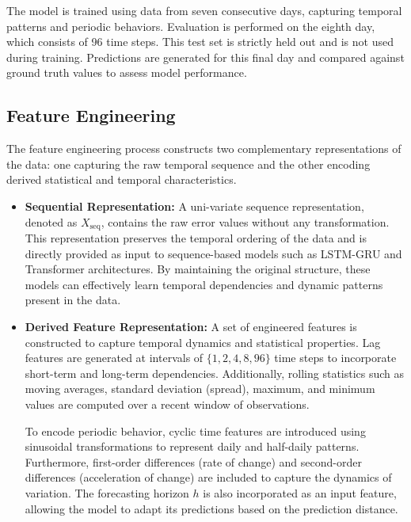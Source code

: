 \documentclass[conference]{IEEEtran}
\begin{document}
The model is trained using data from seven consecutive days, capturing temporal patterns and periodic behaviors. Evaluation is performed on the eighth day, which consists of 96 time steps. This test set is strictly held out and is not used during training. Predictions are generated for this final day and compared against ground truth values to assess model performance.

\subsection{Feature Engineering}

The feature engineering process constructs two complementary representations of the data: one capturing the raw temporal sequence and the other encoding derived statistical and temporal characteristics.

\begin{itemize}

\item \textbf{Sequential Representation:}  
A uni-variate sequence representation, denoted as $X_{\text{seq}}$, contains the raw error values without any transformation. This representation preserves the temporal ordering of the data and is directly provided as input to sequence-based models such as LSTM-GRU and Transformer architectures. By maintaining the original structure, these models can effectively learn temporal dependencies and dynamic patterns present in the data.

\item \textbf{Derived Feature Representation:}  
A set of engineered features is constructed to capture temporal dynamics and statistical properties. Lag features are generated at intervals of $\{1, 2, 4, 8, 96\}$ time steps to incorporate short-term and long-term dependencies. Additionally, rolling statistics such as moving averages, standard deviation (spread), maximum, and minimum values are computed over a recent window of observations.

To encode periodic behavior, cyclic time features are introduced using sinusoidal transformations to represent daily and half-daily patterns. Furthermore, first-order differences (rate of change) and second-order differences (acceleration of change) are included to capture the dynamics of variation. The forecasting horizon $h$ is also incorporated as an input feature, allowing the model to adapt its predictions based on the prediction distance.

\end{itemize}
\end{document}
